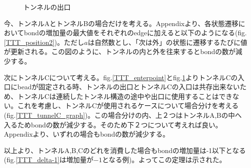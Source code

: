 \documentclass[a4,dvipdfmx,11pt]{article}
\theoremstyle{definition}
\begin{document}
\begin{figure}[h]
  \begin{center}
    \caption{トンネルの出口}
    \label{TTT_exitpoint}
  \end{center}
\end{figure}

今、トンネルAとトンネルBの場合だけを考える。Appendixより、各状態遷移においてbondの増加量の最大値をそれぞれのedgeに加えると以下のようになる(fig.\ref{TTT_position2})。ただし$a$は自然数とし、「次は外」の状態に遷移するたびに値が更新される。この図のように、トンネルの内と外を往来するとbondの数が減少する。


次にトンネルCについて考える。fig.\ref{TTT_enterpoint}とfig.\ref{TTT_exitpoint}よりトンネルCの入口にbeadが固定される時、トンネルの出口とトンネルCの入口は共存出来ないため、トンネルCは連続したトンネル構造の途中や出口に使用することはできない。これを考慮し、トンネルCが使用されるケースについて場合分けを考える(fig.\ref{TTT_tunnelC_graph})。この場合分けの内、上２つはトンネルA,Bの中へ入るためbondの数が減少する。そのため下２つについて考えれば良い。Appendixより、いずれの場合もbondの数が減少する。



以上より、トンネルA,B,Cのどれを消費した場合もbondの増加量は-1以下となる(fig.\ref{TTT_delta-1}は増加量が$-1$となる例)。よってこの定理は示された。
\end{document}
